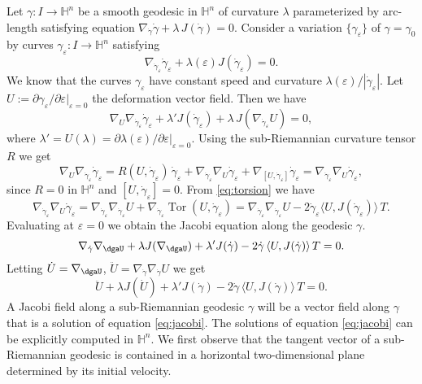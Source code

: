\documentclass[10pt]{amsart}
\theoremstyle{definition}
\theoremstyle{remark}
\numberwithin{equation}{section}
\begin{document}
Let ${\gamma}:I\to{{\mathbb{H}}}^n$ be a smooth geodesic in ${{\mathbb{H}}}^n$ of curvature ${\lambda}$ parameterized by arc-length satisfying equation $\nabla_{\dot{\gamma}}\dot{\gamma}+{\lambda}\,J(\dot{\gamma})=0$. Consider a variation $\{{\gamma}_{\varepsilon}\}$ of ${\gamma}={\gamma}_0$ by curves ${\gamma}_{\varepsilon}:I\to{{\mathbb{H}}}^n$ satisfying
\[
\nabla_{{\dot{\gamma}}_{\varepsilon}}{\dot{\gamma}}_{\varepsilon}+{\lambda}({\varepsilon})J({\dot{\gamma}}_{\varepsilon})=0.
\]
We know that the curves ${\gamma}_{\varepsilon}$ have constant speed and curvature ${\lambda}({\varepsilon})/|{\dot{\gamma}}_{\varepsilon}|$. Let $U:={\partial}{\gamma}_{\varepsilon}/{\partial}{\varepsilon}|_{{\varepsilon}=0}$ the deformation vector field. Then we have
\[
\nabla_{U}\nabla_{{\dot{\gamma}}_{\varepsilon}}{\dot{\gamma}}_{\varepsilon}+{\lambda}'J({\dot{\gamma}}_{\varepsilon})+{\lambda}\,J(\nabla_{{\dot{\gamma}}_{\varepsilon}}U)=0,
\]
where ${\lambda}'=U({\lambda})={\partial} {\lambda}({\varepsilon})/{\partial}{\varepsilon}|_{{\varepsilon}=0}$. Using the sub-Riemannian curvature tensor $R$ we get
\[
\nabla_{U}\nabla_{{\dot{\gamma}}_{\varepsilon}}{\dot{\gamma}}_{\varepsilon}=R(U,{\dot{\gamma}}_{\varepsilon})\,{\dot{\gamma}}_{\varepsilon}+\nabla_{{\dot{\gamma}}_{\varepsilon}}\nabla_{U}{\dot{\gamma}}_{\varepsilon}
+\nabla_{[U,{\dot{\gamma}}_{\varepsilon}]}{\dot{\gamma}}_{\varepsilon}=\nabla_{{\dot{\gamma}}_{\varepsilon}}\nabla_{U}{\dot{\gamma}}_{\varepsilon},
\]
since $R=0$ in ${{\mathbb{H}}}^n$ and $[U,{\dot{\gamma}}_{\varepsilon}]=0$. From \eqref{eq:torsion} we have
\begin{equation*}
\nabla_{{\dot{\gamma}}_{\varepsilon}}\nabla_{U}{\dot{\gamma}}_{\varepsilon}=\nabla_{{\dot{\gamma}}_{\varepsilon}}\nabla_{{\dot{\gamma}}_{\varepsilon}}U
+\nabla_{{\dot{\gamma}}_{\varepsilon}}\operatorname{Tor}(U, {\dot{\gamma}}_{\varepsilon})=\nabla_{{\dot{\gamma}}_{\varepsilon}}\nabla_{{\dot{\gamma}}_{\varepsilon}}U-2{\dot{\gamma}}_{\varepsilon}{\langle{U,J({\dot{\gamma}}_{\varepsilon})}\rangle}\,T.
\end{equation*}
Evaluating at ${\varepsilon}=0$ we obtain the Jacobi equation along the geodesic ${\gamma}$. 
\begin{equation*}
\nabla_{\dot{\gamma}}\nabla_\dgaU+{\lambda} J(\nabla_\dgaU)+{\lambda}'
J({\dot{\gamma}})-2{\dot{\gamma}}\,{\langle{U,J({\dot{\gamma}})}\rangle}\,T=0.
\end{equation*}
Letting $\dot{U}=\nabla_\dgaU$, $\ddot{U}=\nabla_{\dot{\gamma}}\nabla_{\dot{\gamma}} U$ we get
\begin{equation}
\label{eq:jacobi}
\ddot{U}+{\lambda} J(\dot{U})+{\lambda}'
J({\dot{\gamma}})-2{\dot{\gamma}}\,{\langle{U,J({\dot{\gamma}})}\rangle}\,T=0.
\end{equation}
A Jacobi field along a sub-Riemannian geodesic ${\gamma}$ will be a vector field along ${\gamma}$ that is a solution of equation \eqref{eq:jacobi}. The solutions of equation \eqref{eq:jacobi} can be explicitly computed in ${{\mathbb{H}}}^n$. We first observe that the tangent vector of a sub-Riemannian geodesic is contained in a horizontal two-dimensional plane determined by its initial velocity.
\end{document}
